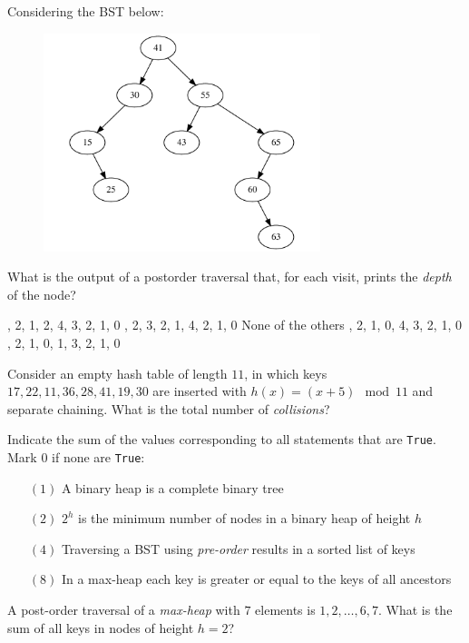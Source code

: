 \documentclass[12pt,addpoints]{exam}
\begin{document}
\pagebreak

\begin{questions}

\question[5] Considering the BST below:
\begin{figure}[h!]
  \centering
  \includegraphics[height=2.5in]{imgs/bst.pdf}
\end{figure}

What is the output of a postorder traversal that, for each visit, prints the {\it depth} of the node?
\begin{choices}	
	, 2, 1, 2, 4, 3, 2, 1, 0	
	, 2, 3, 2, 1, 4, 2, 1, 0	
	\choice None of the others	
	, 2, 1, 0, 4, 3, 2, 1, 0	
	, 2, 1, 0, 1, 3, 2, 1, 0
\end{choices}
\answerline

\question[5] 
Consider an empty hash table of length $11$, in which keys $17,22,11,36,28,41,19,30$ are inserted with $h(x)=(x+5) \mod 11$ and separate chaining.  What is the total number of {\it collisions}?
\answerline

\question[5] 
Indicate the sum of the values corresponding to all statements that are \verb|True|.  Mark $0$ if none are \verb|True|:
\begin{itemize}
	\item[$(1)$] A binary heap is a complete binary tree
	\item[$(2)$] $2^h$ is the minimum number of nodes in a binary heap of height $h$
	\item[$(4)$] Traversing a BST using {\it pre-order} results in a sorted list of keys
	\item[$(8)$] In a max-heap each key is greater or equal to the keys of all ancestors\end{itemize}
\answerline

\question[5] 
A post-order traversal of a {\it max-heap} with $7$ elements is $1,2,\dots,6,7$.  What is the sum of all keys in nodes of height $h=2$?
\answerline


\end{questions}
\end{document}
